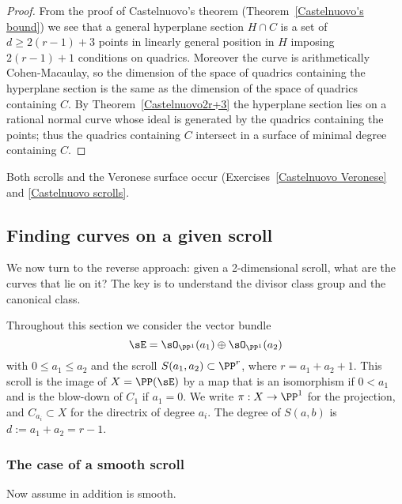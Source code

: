\begin{proof}
From the proof of Castelnuovo's theorem (Theorem~\ref{Castelnuovo's bound}) we see that a general hyperplane
section $H\cap C$ is a set of $d\geq 2(r-1)+3$ points in linearly general position in $H$ imposing $2(r-1)+1$ conditions on quadrics. Moreover the curve
is arithmetically Cohen-Macaulay, so the dimension of the space of quadrics containing the hyperplane section
is the same as the dimension of the space of quadrics containing $C$. By Theorem~\ref{Castelnuovo2r+3} the hyperplane
section lies on a rational normal curve whose ideal is generated by the quadrics containing the points;
thus the quadrics containing $C$ intersect in a surface of minimal degree containing $C$.
\end{proof}

Both scrolls and the Veronese surface occur (Exercises~\ref{Castelnuovo Veronese} and \ref{Castelnuovo scrolls}.

\subsection{Finding curves on a given scroll}

We now turn to the reverse approach: given a 2-dimensional scroll, what are the curves that lie on it?
The key is to understand the divisor class group and the canonical class.

 Throughout this section we consider the vector bundle 
$$
\sE = \sO_{\PP^1}(a_1) \oplus\sO_{\PP^1}(a_2)
$$
with $0\leq a_1\leq a_2$ and the 
scroll $ S(a_1, a_2) \subset \PP^r$, where $r= a_1+a_2+1$. This scroll is the image of $X = \PP(\sE)$ by a map that is an isomorphism
if $0<a_1$ and is the blow-down of  $C_1$ if $a_1=0$.  We write $\pi:X \to \PP^1$ for the projection, and
$C_{a_i}\subset X$ for the directrix of degree $a_i$. The degree of $S(a,b)$ is $d := a_1+a_2 = r-1$.

 \subsubsection{The case of a  smooth scroll}

Now assume in addition  is smooth.

